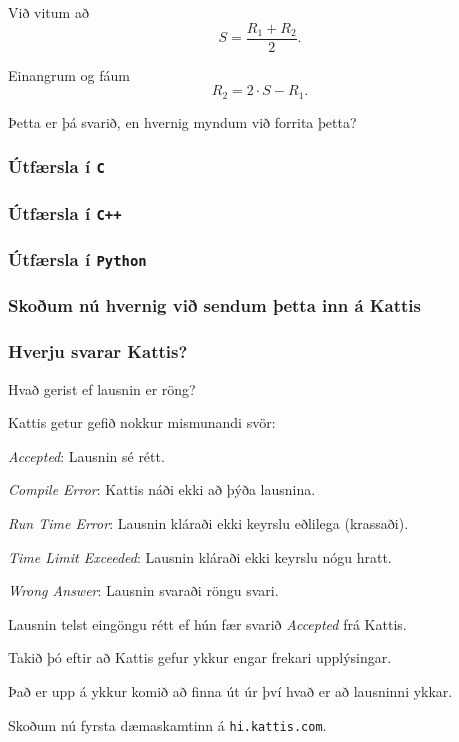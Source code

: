 {
    {
        \item<1-> Við vitum að
        \[
            S = \frac{R_1 + R_2}{2}.
        \]
        \item<2-> Einangrum og fáum
        \[
            R_2 = 2 \cdot S - R_1.
        \]
        \item<3-> Þetta er þá svarið, en hvernig myndum við forrita þetta?
    }
}

{
    \frametitle{Útfærsla í \texttt{C}}
}

{
    \frametitle{Útfærsla í \texttt{C++}}
}

{
    \frametitle{Útfærsla í \texttt{Python}}
}

{
    \frametitle{Skoðum nú hvernig við sendum þetta inn á Kattis}
}

{
    \frametitle{Hverju svarar Kattis?}
    {
        \item<1-> Hvað gerist ef lausnin er röng?
        \item<2-> Kattis getur gefið nokkur mismunandi svör:
        \item<3-> \emph{Accepted}: Lausnin sé rétt.
        \item<4-> \emph{Compile Error}: Kattis náði ekki að þýða lausnina.
        \item<5-> \emph{Run Time Error}: Lausnin kláraði ekki keyrslu eðlilega (krassaði).
        \item<6-> \emph{Time Limit Exceeded}: Lausnin kláraði ekki keyrslu nógu hratt.
        \item<7-> \emph{Wrong Answer}: Lausnin svaraði röngu svari.
        \item<8-> Lausnin telst eingöngu rétt ef hún fær svarið \emph{Accepted} frá Kattis.
    }
}

{
    {
        \item<1-> Takið þó eftir að Kattis gefur ykkur engar frekari upplýsingar.
        \item<2-> Það er upp á ykkur komið að finna út úr því hvað er að lausninni ykkar.
    }
}

{
    {
        \item<1-> Skoðum nú fyrsta dæmaskamtinn á \texttt{hi.kattis.com}.
    }
}

{
}



